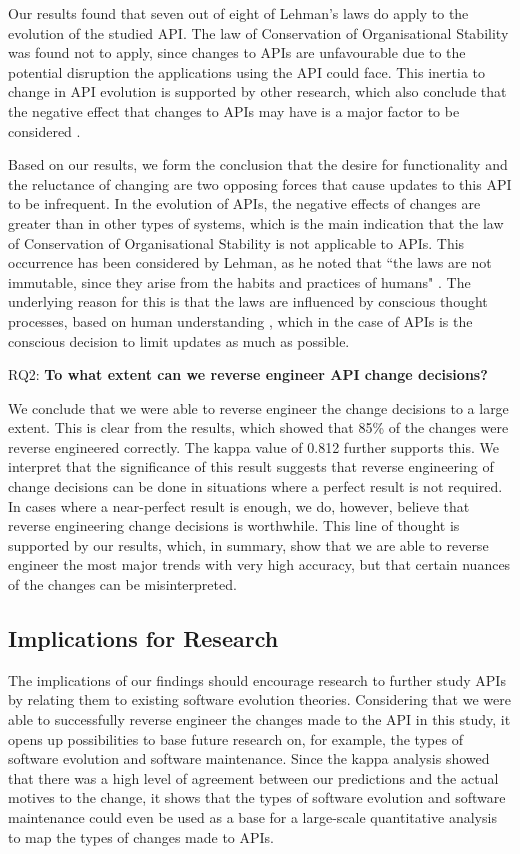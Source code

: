 \documentclass{sig-alternate}
\begin{document}
Our results found that seven out of eight of Lehman's laws do apply to the evolution of the studied API. The law of Conservation of Organisational Stability was found not to apply, since changes to APIs are unfavourable due to the potential disruption the applications using the API could face. This inertia to change in API evolution is supported by other research, which also conclude that the negative effect that changes to APIs may have is a major factor to be considered \cite{google_talk, henning2007api, mcdonnell2013empirical, robbes2012developers}. 

Based on our results, we form the conclusion that the desire for functionality and the reluctance of changing are two opposing forces that cause updates to this API to be infrequent. In the evolution of APIs, the negative effects of changes are greater than in other types of systems, which is the main indication that the law of Conservation of Organisational Stability is not applicable to APIs. This occurrence has been considered by Lehman, as he noted that ``the laws are not immutable, since they arise from the habits and practices of humans" \cite{lehman1980programs}. The underlying reason for this is that the laws are influenced by conscious thought processes, based on human understanding \cite{lehman1980understanding}, which in the case of APIs is the conscious decision to limit updates as much as possible. 

\smallskip
\noindent
RQ2: \textbf{To what extent can we reverse engineer API change decisions?}
\smallskip

We conclude that we were able to reverse engineer the change decisions to a large extent. This is clear from the results, which showed that 85\% of the changes were reverse engineered correctly. The kappa value of 0.812 further supports this. We interpret that the significance of this result suggests that reverse engineering of change decisions can be done in situations where a perfect result is not required. In cases where a near-perfect result is enough, we do, however, believe that reverse engineering change decisions is worthwhile. This line of thought is supported by our results, which, in summary, show that we are able to reverse engineer the most major trends with very high accuracy, but that certain nuances of the changes can be misinterpreted. 



\subsection{Implications for Research} 
The implications of our findings should encourage research to further study APIs by relating them to existing software evolution theories. Considering that we were able to successfully reverse engineer the changes made to the API in this study, it opens up possibilities to base future research on, for example, the types of software evolution and software maintenance. Since the kappa analysis showed that there was a high level of agreement between our predictions and the actual motives to the change, it shows that the types of software evolution and software maintenance could even be used as a base for a large-scale quantitative analysis to map the types of changes made to APIs. 
\end{document}
